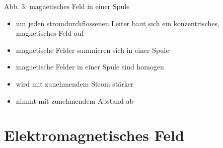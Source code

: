 \begin{frame}
\begin{center}
\begin{minipage}{0.45\textwidth}
\begin{center}
                {\scriptsize Abb. 3: magnetisches Feld in einer Spule\\
                }
            \end{center}
        \end{minipage}
       
        \bigskip

        \begin{itemize}
            \item um jeden stromdurchflossenen Leiter baut sich ein konzentrisches, magnetisches Feld auf
            \item magnetische Felder summieren sich in einer Spule
            \item magnetische Felder in einer Spule sind homogen
            \item wird mit zunehmendem Strom stärker
            \item nimmt mit zunehmendem Abstand ab
        \end{itemize}

    \end{center}
\end{frame}

\section*{Elektro\-magnetisches Feld}

